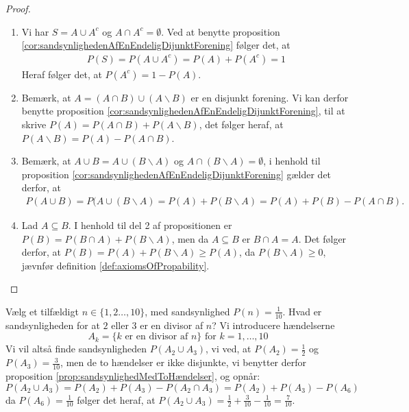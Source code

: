 \begin{proof}
\ %
\begin{enumerate}
    \item Vi har $S=A \cup A^c$ og $A \cap A^c=\emptyset$. Ved at benytte proposition \ref{cor:sandsynlighedenAfEnEndeligDijunktForening} følger det, at 
\begin{align*}
    P(S)=P(A \cup A^c) = P(A) + P(A^c) = 1
\end{align*}
Heraf følger det, at $P(A^c) = 1 - P(A)$.
    
    \item Bemærk, at $A = (A \cap B) \cup (A \backslash B)$ er en disjunkt forening. Vi kan derfor benytte proposition \ref{cor:sandsynlighedenAfEnEndeligDijunktForening}, til at skrive
    $P(A) = P(A \cap B) + P(A \backslash B)$, det følger heraf, at $P(A \backslash B) = P(A) - P(A \cap B)$.
    
    \item Bemærk, at $A\cup B=A\cup (B\backslash A)$ og $A\cap (B \backslash A)=\emptyset$, i henhold til proposition \ref{cor:sandsynlighedenAfEnEndeligDijunktForening} gælder det derfor, at
    \begin{align*}
        P(A\cup B) = P(A \cup (B \backslash A) = P(A)+P(B\backslash A)=P(A)+P(B)-P(A\cap B).
    \end{align*}
    
    \item Lad $A \subseteq B$. I henhold til del 2 af propositionen er $P(B) = P(B \cap A) + P(B \backslash A)$, men da $A \subseteq B$ er $B \cap A = A$. Det følger derfor, at $P(B) = P(A) + P(B \backslash A) \geq P(A)$, da $P(B \backslash A) \geq 0$, jævnfør definition \ref{def:axiomsOfPropability}.
\end{enumerate}
\end{proof}


 
\begin{exmp} %
Vælg et tilfældigt $n \in \{1, 2 \ldots, 10\}$, med sandsynlighed $P(n)=\frac{1}{10}$. Hvad er sandsynligheden for at $2$ eller $3$ er en divisor af $n$?
Vi introducere hændelserne
\begin{equation*}
    A_k = \{k \text{ er en divisor af } n\} \text{ for } k = 1, \ldots, 10  
\end{equation*}
Vi vil altså finde sandsynligheden $P(A_2 \cup A_3)$, vi ved, at $P(A_2) = \frac{1}{2}$ og $P(A_3) = \frac{3}{10}$, men de to hændelser er ikke disjunkte, vi benytter derfor proposition \ref{prop:sandsynlighedMedToHændelser}, og opnår:
\begin{equation*}
    P(A_2 \cup A_3) = P(A_2) + P(A_3) - P(A_2 \cap A_3) = P(A_2) + P(A_3) - P(A_6)
\end{equation*}
da $P(A_6) = \frac{1}{10}$ følger det heraf, at $P(A_2 \cup A_3) = \frac{1}{2} + \frac{3}{10} - \frac{1}{10} = \frac{7}{10}$.
\end{exmp}


